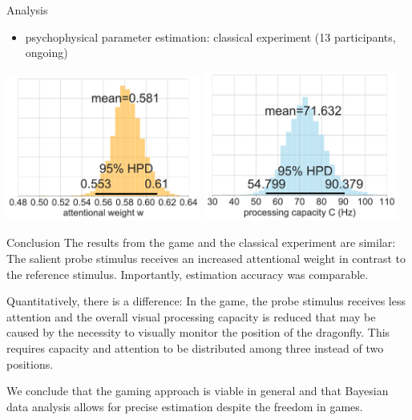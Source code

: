 \documentclass[a0paper,portrait]{baposter}
\begin{document}
\begin{poster}
\begin{posterbox}[name=results,span=1,column=2,row=0]{Analysis}
			\begin{itemize}
				\item psychophysical parameter estimation: classical experiment (13 participants, ongoing)
			\end{itemize}
			
			\begin{center}
				\includegraphics[width=0.48\textwidth]{exp-w-hdi-rs.pdf}
				\includegraphics[width=0.48\textwidth]{exp-c-hdi-rs.pdf}
			\end{center}
			
		\end{posterbox}
		
		\begin{posterbox}[name=conclusion,span=1,column=2,row=2,below=results]{Conclusion}
			The results from the game and the classical experiment are similar: The salient probe stimulus receives an increased attentional weight in contrast to the reference stimulus. Importantly, estimation accuracy was comparable.
			
			Quantitatively, there is a difference: In the game, the probe stimulus receives less attention and the overall visual processing capacity is reduced that may be caused by the necessity to visually monitor the position of the dragonfly. This requires capacity and attention to be distributed among three instead of two positions.
			
			We conclude that the gaming approach is viable in general and that Bayesian data analysis allows for precise estimation despite the freedom in games.
		\end{posterbox}
		

\end{poster}
\end{document}
